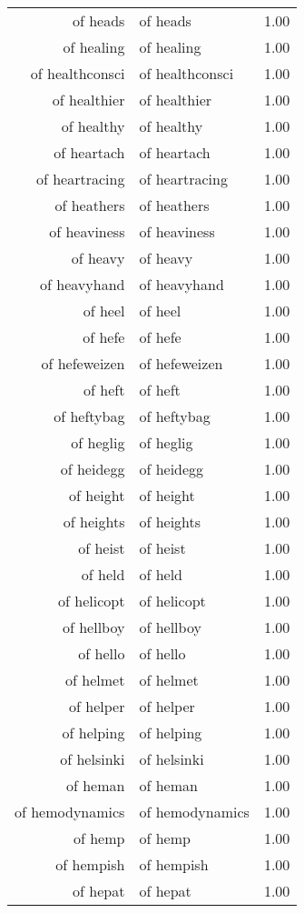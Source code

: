 \begin{table}[ht]
\begin{tabular}{rlr}
  of heads & of heads & 1.00 \\ 
  of healing & of healing & 1.00 \\ 
  of healthconsci & of healthconsci & 1.00 \\ 
  of healthier & of healthier & 1.00 \\ 
  of healthy & of healthy & 1.00 \\ 
  of heartach & of heartach & 1.00 \\ 
  of heartracing & of heartracing & 1.00 \\ 
  of heathers & of heathers & 1.00 \\ 
  of heaviness & of heaviness & 1.00 \\ 
  of heavy & of heavy & 1.00 \\ 
  of heavyhand & of heavyhand & 1.00 \\ 
  of heel & of heel & 1.00 \\ 
  of hefe & of hefe & 1.00 \\ 
  of hefeweizen & of hefeweizen & 1.00 \\ 
  of heft & of heft & 1.00 \\ 
  of heftybag & of heftybag & 1.00 \\ 
  of heglig & of heglig & 1.00 \\ 
  of heidegg & of heidegg & 1.00 \\ 
  of height & of height & 1.00 \\ 
  of heights & of heights & 1.00 \\ 
  of heist & of heist & 1.00 \\ 
  of held & of held & 1.00 \\ 
  of helicopt & of helicopt & 1.00 \\ 
  of hellboy & of hellboy & 1.00 \\ 
  of hello & of hello & 1.00 \\ 
  of helmet & of helmet & 1.00 \\ 
  of helper & of helper & 1.00 \\ 
  of helping & of helping & 1.00 \\ 
  of helsinki & of helsinki & 1.00 \\ 
  of heman & of heman & 1.00 \\ 
  of hemodynamics & of hemodynamics & 1.00 \\ 
  of hemp & of hemp & 1.00 \\ 
  of hempish & of hempish & 1.00 \\ 
  of hepat & of hepat & 1.00 \\ 

\end{tabular}
\end{table}
